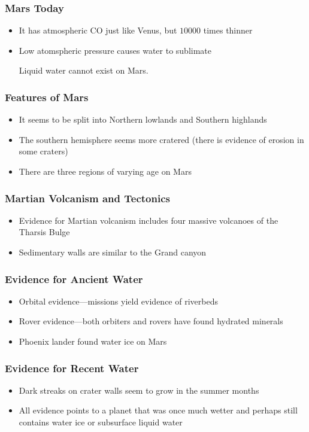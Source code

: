 \documentclass[class=article, crop=false]{standalone}
\begin{document}
  \subsubsection{Mars Today}
  \begin{itemize}
    \item It has atmospheric CO just like Venus, but $10000$ times thinner
    \item Low atomspheric pressure causes water to sublimate
    \begin{note}{}
      Liquid water cannot exist on Mars.
    \end{note}
  \end{itemize}
  \subsubsection{Features of Mars}
  \begin{itemize}
    \item It seems to be split into Northern lowlands and Southern highlands
    \item The southern hemisphere seems more cratered (there is evidence of erosion in some craters)
    \item There are three regions of varying age on Mars
  \end{itemize}
  \subsubsection{Martian Volcanism and Tectonics}
  \begin{itemize}
    \item Evidence for Martian volcanism includes four massive volcanoes of the Tharsis Bulge
    \item Sedimentary walls are similar to the Grand canyon
  \end{itemize}
  \subsubsection{Evidence for Ancient Water}
  \begin{itemize}
    \item Orbital evidence---missions yield evidence of riverbeds
    \item Rover evidence---both orbiters and rovers have found hydrated minerals
    \item Phoenix lander found water ice on Mars
  \end{itemize}
  \subsubsection{Evidence for Recent Water}
  \begin{itemize}
    \item Dark streaks on crater walls seem to grow in the summer months
    \item All evidence points to a planet that was once much wetter and perhaps still contains water ice or subsurface liquid water
  \end{itemize}
\end{document}
